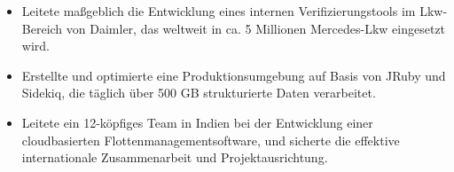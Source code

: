 \begin{minipage}{\linewidth}
\begin{itemize}
  \item Leitete maßgeblich die Entwicklung eines internen Verifizierungstools im Lkw-Bereich von Daimler, das weltweit in ca. 5 Millionen Mercedes-Lkw eingesetzt wird.
  \item Erstellte und optimierte eine Produktionsumgebung auf Basis von JRuby und Sidekiq, die täglich über 500 GB strukturierte Daten verarbeitet.
  \item Leitete ein 12-köpfiges Team in Indien bei der Entwicklung einer cloudbasierten Flottenmanagementsoftware, und sicherte die effektive internationale Zusammenarbeit und Projektausrichtung.
\end{itemize}
\end{minipage}
\divider